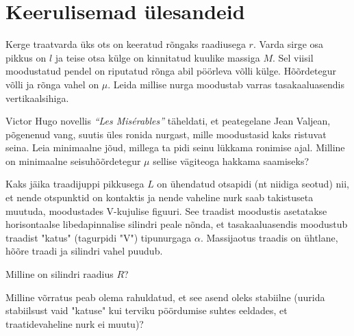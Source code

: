 \documentclass[a4paper,11pt,twocolumn]{article}
\begin{document}
\section{Keerulisemad ülesandeid}	
\begin{question}[sta3][2.2cm]
	Kerge traatvarda üks ots on keeratud rõngaks raadiusega $r$. Varda sirge osa pikkus on $l$ ja teise otsa külge on kinnitatud kuulike massiga $M$. Sel viisil moodustatud pendel on riputatud rõnga abil pöörleva võlli külge. Hõõrdetegur võlli ja rõnga vahel on $\mu$. Leida millise nurga moodustab varras tasakaaluasendis vertikaalsihiga.
\end{question}
\begin{question}[200PPP, P10]
	Victor Hugo novellis \textit{\enquote{Les Misérables}} täheldati, et peategelane Jean Valjean, põgenenud vang, suutis üles ronida nurgast, mille moodustasid kaks ristuvat seina. Leia minimaalne jõud, millega ta pidi seinu lükkama ronimise ajal. Milline on minimaalne seisuhõõrdetegur $ \mu $ sellise vägiteoga hakkama saamiseks?
\end{question}
\begin{question}[Lõppv 2017, G9]
	Kaks jäika traadijuppi pikkusega $L$ on ühendatud otsapidi (nt niidiga seotud) nii, et nende otspunktid on kontaktis ja nende vaheline nurk saab takistuseta muutuda, moodustades V-kujulise figuuri. See traadist moodustis asetatakse horisontaalse libedapinnalise silindri peale nõnda, et tasakaaluasendis moodustub traadist "katus" (tagurpidi "V") tipunurgaga $\alpha$. Massijaotus traadis on ühtlane, hõõre traadi ja silindri vahel puudub.
	\begin{subquestion}
		\item Milline on silindri raadius $R$?
		\item Milline võrratus peab olema rahuldatud, et see asend oleks stabiilne (uurida stabiilsust vaid "katuse" kui terviku pöördumise suhtes eeldades, et traatidevaheline nurk ei muutu)? 
	\end{subquestion}
\end{question}
\end{document}
